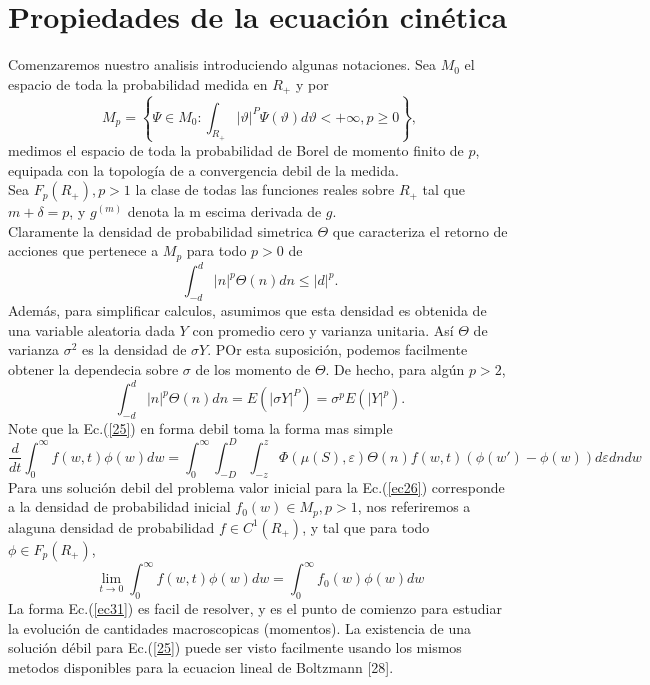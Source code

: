 \documentclass[12pt,a4paper]{article}
\begin{document}
\section*{Propiedades de la ecuación cinética}
Comenzaremos nuestro analisis introduciendo algunas notaciones. Sea $M_0$ el espacio de toda la probabilidad medida en $R_{+}$  y por 
\begin{equation}
M_p=\left\{\Psi \in M_0:\int_{R_{+}}|\vartheta|^{P}\Psi(\vartheta)d\vartheta<+\infty,p\geq 0 \right\},
\end{equation}
medimos el espacio de toda la probabilidad de Borel de momento finito de $p$, equipada con la topología de a convergencia debil de la medida.\\
\quad Sea $F_{p}(R_{+}),p>1$ la clase de todas las funciones reales sobre $R_{+}$ tal que $m+\delta=p$, y $g^{(m)}$ denota la m escima derivada de $g$.\\
\quad Claramente la densidad de probabilidad simetrica $\Theta$ que caracteriza el retorno de acciones que pertenece a $M_p$ para todo $p>0$ de
$$
\int^{d}_{-d}|n|^{p}\Theta(n)dn \leq |d|^{p}.
$$ 
Además, para simplificar calculos, asumimos que esta densidad es obtenida de una variable aleatoria dada $Y$ con promedio cero y varianza unitaria. Así $\Theta$ de varianza $\sigma^2$ es la densidad de $\sigma Y$. POr esta suposición, podemos facilmente obtener la dependecia sobre $\sigma$ de los momento de $\Theta$. De hecho, para algún $p>2$,
$$
\int^{d}_{-d}|n|^{p}\Theta(n)dn=E(|\sigma Y|^P)=\sigma^{p}E(|Y|^{p}).
$$ 
\quad Note que la Ec.(\ref{25}) en forma debil toma la forma mas simple
\begin{equation}
\frac{d}{dt}\int^{\infty}_{0} f(w,t)\phi(w)dw = \int^{\infty}_{0}\int^{D}_{-D}\int^{z}_{-z}\Phi(\mu(S),\varepsilon)\Theta(n)f(w,t)(\phi (w')-\phi(w))d\varepsilon dn dw \label{31}
\end{equation}
Para uns solución debil del problema valor inicial para la Ec.(\ref{ec26}) corresponde a la densidad de probabilidad inicial $f_0(w)\in M_{p}, p >1$, nos referiremos a alaguna densidad de probabilidad $f\in C^{1}(R_{+})$, y tal que para todo $\phi \in F_{p}(R_{+})$,
\begin{equation}
\lim_{t\rightarrow 0}\int^{\infty}_{0}f(w,t)\phi(w)dw=\int^{\infty}_{0}f_0(w)\phi(w)dw \label{32}
\end{equation}
La forma Ec.(\ref{ec31}) es facil de resolver, y es el punto de comienzo para estudiar la evolución de cantidades macroscopicas (momentos). La existencia de una solución débil para Ec.(\ref{25}) puede ser visto facilmente usando los mismos metodos disponibles para la ecuacion lineal de Boltzmann [28].\\
\end{document}
